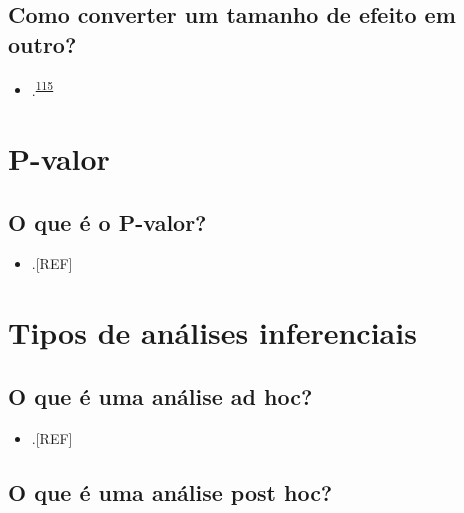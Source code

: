 \documentclass[
]{book}
\providecommand{\tightlist}{%
  \setlength{\itemsep}{0pt}\setlength{\parskip}{0pt}}
\begin{document}
\hypertarget{como-converter-um-tamanho-de-efeito-em-outro}{%
\subsection{Como converter um tamanho de efeito em outro?}\label{como-converter-um-tamanho-de-efeito-em-outro}}

\begin{itemize}
\tightlist
\item
  .\textsuperscript{\protect\hyperlink{ref-Kim2015}{115}}
\end{itemize}

\hypertarget{p-valor}{%
\section{P-valor}\label{p-valor}}

\hypertarget{o-que-uxe9-o-p-valor}{%
\subsection{O que é o P-valor?}\label{o-que-uxe9-o-p-valor}}

\begin{itemize}
\tightlist
\item
  .{[}REF{]}
\end{itemize}

\hypertarget{tipos-analises-inferenciais}{%
\section{Tipos de análises inferenciais}\label{tipos-analises-inferenciais}}

\hypertarget{o-que-uxe9-uma-anuxe1lise-ad-hoc}{%
\subsection{O que é uma análise ad hoc?}\label{o-que-uxe9-uma-anuxe1lise-ad-hoc}}

\begin{itemize}
\tightlist
\item
  .{[}REF{]}
\end{itemize}

\hypertarget{o-que-uxe9-uma-anuxe1lise-post-hoc}{%
\subsection{O que é uma análise post hoc?}\label{o-que-uxe9-uma-anuxe1lise-post-hoc}}
\end{document}
